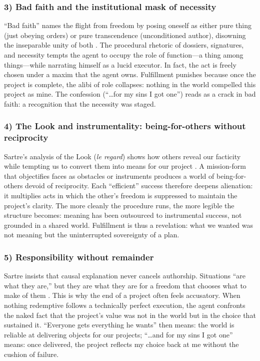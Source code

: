 \subsubsection*{3) Bad faith and the institutional mask of necessity}

``Bad faith'' names the flight from freedom by posing oneself as either pure thing (just obeying
orders) or pure transcendence (unconditioned author), disowning the inseparable unity of both
\parencite[pp.~86--116]{SartreBN2003}. The procedural rhetoric of dossiers, signatures, and
necessity tempts the agent to occupy the role of function—a thing among things—while narrating
himself as a lucid executor. In fact, the act is freely chosen under a maxim that the agent owns.
Fulfillment punishes because once the project is complete, the alibi of role collapses: nothing
in the world compelled this project as mine. The confession (``\ldots for my sins I got one'')
reads as a crack in bad faith: a recognition that the necessity was staged.

\subsubsection*{4) The Look and instrumentality: being-for-others without reciprocity}

Sartre's analysis of the Look (\emph{le regard}) shows how others reveal our facticity while
tempting us to convert them into means for our project \parencite[pp.~252--302]{SartreBN2003}.
A mission-form that objectifies faces as obstacles or instruments produces a world of
being-for-others devoid of reciprocity. Each ``efficient'' success therefore deepens alienation:
it multiplies acts in which the other's freedom is suppressed to maintain the project's clarity.
The more cleanly the procedure runs, the more legible the structure becomes: meaning has been
outsourced to instrumental success, not grounded in a shared world. Fulfillment is thus a
revelation: what we wanted was not meaning but the uninterrupted sovereignty of a plan.

\subsubsection*{5) Responsibility without remainder}

Sartre insists that causal explanation never cancels authorship. Situations ``are what they
are,'' but they are what they are for a freedom that chooses what to make of them
\parencite[pp.~553--561]{SartreBN2003}. This is why the end of a project often feels accusatory.
When nothing redemptive follows a technically perfect execution, the agent confronts the naked
fact that the project's value was not in the world but in the choice that sustained it.
``Everyone gets everything he wants'' then means: the world is reliable at delivering objects
for our projects; ``\ldots and for my sins I got one'' means: once delivered, the project
reflects my choice back at me without the cushion of failure.

